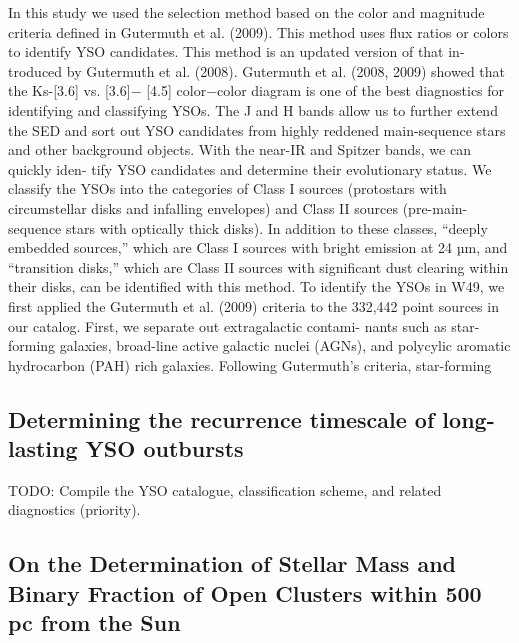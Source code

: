 \documentclass[../main.tex]{subfiles}
\begin{document}
{In this study we used the selection method based on
the color and magnitude criteria defined in Gutermuth et al.
(2009). This method uses flux ratios or colors to identify
YSO candidates. This method is an updated version of that in-
troduced by Gutermuth et al. (2008). Gutermuth et al. (2008,
2009) showed that the Ks-[3.6] vs. [3.6]− [4.5] color−color
diagram is one of the best diagnostics for identifying and
classifying YSOs. The J and H bands allow us to further
extend the SED and sort out YSO candidates from highly
reddened main-sequence stars and other background objects.
With the near-IR and Spitzer bands, we can quickly iden-
tify YSO candidates and determine their evolutionary status.
We classify the YSOs into the categories of Class I sources
(protostars with circumstellar disks and infalling envelopes)
and Class II sources (pre-main-sequence stars with optically
thick disks). In addition to these classes, “deeply embedded
sources,” which are Class I sources with bright emission at
24 µm, and “transition disks,” which are Class II sources with
significant dust clearing within their disks, can be identified
with this method.
To identify the YSOs in W49, we first applied the
Gutermuth et al. (2009) criteria to the 332,442 point sources
in our catalog. First, we separate out extragalactic contami-
nants such as star-forming galaxies, broad-line active galactic
nuclei (AGNs), and polycylic aromatic hydrocarbon (PAH)
rich galaxies. Following Gutermuth’s criteria, star-forming

\subsection{Determining the recurrence timescale of long-lasting YSO
	outbursts}


TODO: Compile the YSO catalogue, classification scheme, and related diagnostics (priority).

\subsection{On the Determination of Stellar Mass and Binary Fraction of Open Clusters within
	500 pc from the Sun}


}
\end{document}
